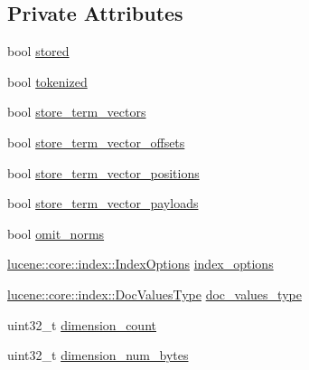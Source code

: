 \subsection*{Private Attributes}
\begin{DoxyCompactItemize}
\item 
bool \mbox{\hyperlink{classlucene_1_1core_1_1document_1_1FieldTypeBuilder_a96a00cd5a6024473a80ba52bf50944d9}{stored}}
\item 
bool \mbox{\hyperlink{classlucene_1_1core_1_1document_1_1FieldTypeBuilder_a4ee7dd8ee0ab648ac27bde1bfe0f711d}{tokenized}}
\item 
bool \mbox{\hyperlink{classlucene_1_1core_1_1document_1_1FieldTypeBuilder_a48d7743e7f0f497e4ef39f855efed128}{store\+\_\+term\+\_\+vectors}}
\item 
bool \mbox{\hyperlink{classlucene_1_1core_1_1document_1_1FieldTypeBuilder_aa4ba493c4fea36d2353a9216920edc00}{store\+\_\+term\+\_\+vector\+\_\+offsets}}
\item 
bool \mbox{\hyperlink{classlucene_1_1core_1_1document_1_1FieldTypeBuilder_a73bfa64852b34f57191268da13b75d40}{store\+\_\+term\+\_\+vector\+\_\+positions}}
\item 
bool \mbox{\hyperlink{classlucene_1_1core_1_1document_1_1FieldTypeBuilder_a1ca8b57f024ce43f8ffcd49a4dba4640}{store\+\_\+term\+\_\+vector\+\_\+payloads}}
\item 
bool \mbox{\hyperlink{classlucene_1_1core_1_1document_1_1FieldTypeBuilder_a503405f9797ba6a3e93915c9f47b4f64}{omit\+\_\+norms}}
\item 
\mbox{\hyperlink{namespacelucene_1_1core_1_1index_a0d5e1f98471a76de106056cf3b5a7897}{lucene\+::core\+::index\+::\+Index\+Options}} \mbox{\hyperlink{classlucene_1_1core_1_1document_1_1FieldTypeBuilder_a139b5baf0ca22d18977f5cf6d64f4f8f}{index\+\_\+options}}
\item 
\mbox{\hyperlink{namespacelucene_1_1core_1_1index_a2f7ffaef6429b5df542c8aa12f8b9883}{lucene\+::core\+::index\+::\+Doc\+Values\+Type}} \mbox{\hyperlink{classlucene_1_1core_1_1document_1_1FieldTypeBuilder_a86c3f0e4735885565b2f70cf171fbc16}{doc\+\_\+values\+\_\+type}}
\item 
uint32\+\_\+t \mbox{\hyperlink{classlucene_1_1core_1_1document_1_1FieldTypeBuilder_a67c239a6d02d8a224f8adb53099f2928}{dimension\+\_\+count}}
\item 
uint32\+\_\+t \mbox{\hyperlink{classlucene_1_1core_1_1document_1_1FieldTypeBuilder_ac0547d965a4fd08e2b36e57a8a20f0d5}{dimension\+\_\+num\+\_\+bytes}}
\end{DoxyCompactItemize}


